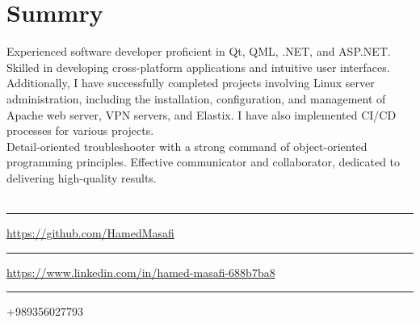 \section{Summry}
Experienced software developer proficient in Qt, QML, .NET, and ASP.NET. Skilled in developing cross-platform applications and intuitive user interfaces. Additionally, I have successfully completed projects involving Linux server administration, including the installation, configuration, and management of Apache web server, VPN servers, and Elastix. I have also implemented CI/CD processes for various projects.
\\
Detail-oriented troubleshooter with a strong command of object-oriented programming principles. Effective communicator and collaborator, dedicated to delivering high-quality results.
\\
\\
\faGithub\rule{1cm}{1pt}\url{https://github.com/HamedMasafi}
\\
\faLinkedin\rule{1cm}{1pt}\url{https://www.linkedin.com/in/hamed-masafi-688b7ba8}
\\
\faPhone\rule{1cm}{1pt}+989356027793
